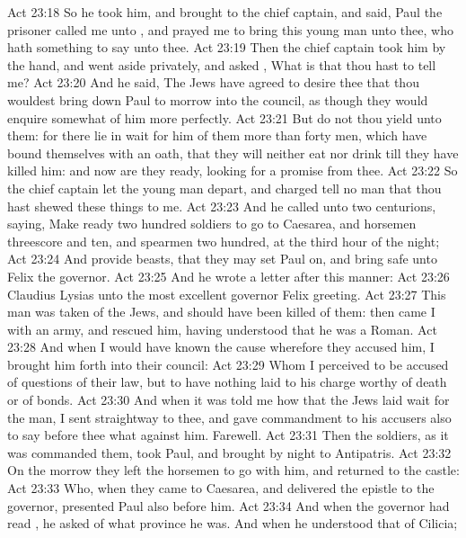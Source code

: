 \vs Act 23:18 So he took him, and brought  to the chief captain, and said, Paul the prisoner called me unto , and prayed me to bring this young man unto thee, who hath something to say unto thee.
\vs Act 23:19 Then the chief captain took him by the hand, and went  aside privately, and asked , What is that thou hast to tell me?
\vs Act 23:20 And he said, The Jews have agreed to desire thee that thou wouldest bring down Paul to morrow into the council, as though they would enquire somewhat of him more perfectly.
\vs Act 23:21 But do not thou yield unto them: for there lie in wait for him of them more than forty men, which have bound themselves with an oath, that they will neither eat nor drink till they have killed him: and now are they ready, looking for a promise from thee.
\vs Act 23:22 So the chief captain  let the young man depart, and charged  tell no man that thou hast shewed these things to me.
\vs Act 23:23 And he called unto  two centurions, saying, Make ready two hundred soldiers to go to Caesarea, and horsemen threescore and ten, and spearmen two hundred, at the third hour of the night;
\vs Act 23:24 And provide  beasts, that they may set Paul on, and bring  safe unto Felix the governor.
\vs Act 23:25 And he wrote a letter after this manner:
\vs Act 23:26 Claudius Lysias unto the most excellent governor Felix  greeting.
\vs Act 23:27 This man was taken of the Jews, and should have been killed of them: then came I with an army, and rescued him, having understood that he was a Roman.
\vs Act 23:28 And when I would have known the cause wherefore they accused him, I brought him forth into their council:
\vs Act 23:29 Whom I perceived to be accused of questions of their law, but to have nothing laid to his charge worthy of death or of bonds.
\vs Act 23:30 And when it was told me how that the Jews laid wait for the man, I sent straightway to thee, and gave commandment to his accusers also to say before thee what  against him. Farewell.
\vs Act 23:31 Then the soldiers, as it was commanded them, took Paul, and brought  by night to Antipatris.
\vs Act 23:32 On the morrow they left the horsemen to go with him, and returned to the castle:
\vs Act 23:33 Who, when they came to Caesarea, and delivered the epistle to the governor, presented Paul also before him.
\vs Act 23:34 And when the governor had read , he asked of what province he was. And when he understood that  of Cilicia;
